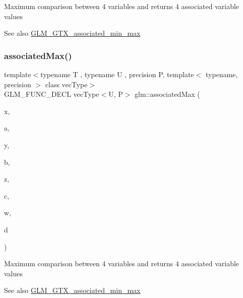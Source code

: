 Maximum comparison between 4 variables and returns 4 associated variable values \begin{DoxySeeAlso}{See also}
\hyperlink{group__gtx__associated__min__max}{G\+L\+M\+\_\+\+G\+T\+X\+\_\+associated\+\_\+min\+\_\+max} 
\end{DoxySeeAlso}
\mbox{\label{group__gtx__associated__min__max_gaf607886421c35cd7e4f41a50d7c330e3}} 
\subsubsection{\texorpdfstring{associated\+Max()}{associatedMax()}\hspace{0.1cm}{\footnotesize\ttfamily [10/12]}}
{\footnotesize\ttfamily template$<$typename T , typename U , precision P, template$<$ typename, precision $>$ class vec\+Type$>$ \\
G\+L\+M\+\_\+\+F\+U\+N\+C\+\_\+\+D\+E\+CL vec\+Type$<$U, P$>$ glm\+::associated\+Max (\begin{DoxyParamCaption}\item[{vec\+Type$<$ T, P $>$ const \&}]{x,  }\item[{vec\+Type$<$ U, P $>$ const \&}]{a,  }\item[{vec\+Type$<$ T, P $>$ const \&}]{y,  }\item[{vec\+Type$<$ U, P $>$ const \&}]{b,  }\item[{vec\+Type$<$ T, P $>$ const \&}]{z,  }\item[{vec\+Type$<$ U, P $>$ const \&}]{c,  }\item[{vec\+Type$<$ T, P $>$ const \&}]{w,  }\item[{vec\+Type$<$ U, P $>$ const \&}]{d }\end{DoxyParamCaption})}

Maximum comparison between 4 variables and returns 4 associated variable values \begin{DoxySeeAlso}{See also}
\hyperlink{group__gtx__associated__min__max}{G\+L\+M\+\_\+\+G\+T\+X\+\_\+associated\+\_\+min\+\_\+max} 
\end{DoxySeeAlso}
\mbox{\label{group__gtx__associated__min__max_ga7a165de1af9a3f9193516a3b47407086}} 
